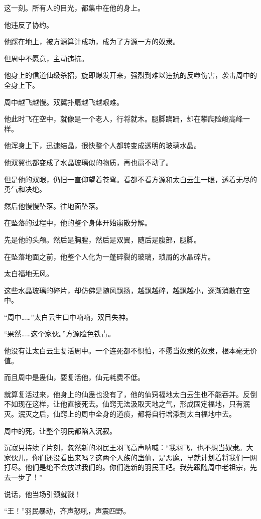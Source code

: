 \begin{this_body}
这一刻。所有人的目光，都集中在他的身上。

他违反了协约。

他踩在地上，被方源算计成功，成为了方源一方的奴隶。

但周中不愿意，主动违抗。

他身上的信道仙级杀招，旋即爆发开来，强烈到难以违抗的反噬伤害，袭击周中的全身上下。

周中越飞越慢。双翼扑扇越飞越艰难。

他此时飞在空中，就像是一个老人，行将就木。腿脚蹒跚，却在攀爬险峻高峰一样。

他浑身上下，迅速结晶，很快整个人都转变成透明的玻璃水晶。

他双翼也都变成了水晶玻璃似的物质，再也扇不动了。

但是他的双眼，仍旧一直仰望着苍穹。看都不看方源和太白云生一眼，透着无尽的勇气和决绝。

然后他慢慢坠落。往地面坠落。

在坠落的过程中，他的整个身体开始崩散分解。

先是他的头颅。然后是胸膛，然后是双翼，随后是腹部，腿脚。

在坠落地面之前，他整个人化为一蓬碎裂的玻璃，琐屑的水晶碎片。

太白福地无风。

这些水晶玻璃的碎片，却仿佛是随风飘扬，越飘越碎，越飘越小，逐渐消散在空中。

“周中……”太白云生口中喃喃，双目失神。

“果然……这个家伙。”方源脸色铁青。

他没有让太白云生复活周中。一个连死都不惧怕，不愿当奴隶的奴隶，根本毫无价值。

而且周中是蛊仙，要复活他，仙元耗费不低。

就算复活过来，他身上的仙蛊也没有了，他的仙窍福地太白云生也不能吞并。反倒不如现在这样，让他直接死去。仙窍无法汲取天地之气，形成固定福地，只有泯灭。泯灭之后，仙窍上的周中全身的道痕，都将自行增添到太白福地中去。

周中的死，让整个羽民都陷入沉寂。

沉寂只持续了片刻，忽然新的羽民王羽飞高声呐喊：“我羽飞，也不想当奴隶。大家伙儿，你们还没看出来吗？这两个人族的蛊仙，是恶魔，早就计划着将我们一网打尽。他们是绝不会放过我们的。你们选新的羽民王吧。我先跟随周中老祖宗，先去一步了！”

说话，他当场引颈就戮！

“王！”羽民暴动，齐声怒吼，声震四野。


\end{this_body}
